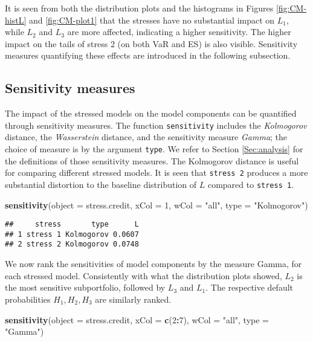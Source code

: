 \documentclass[
]{article}
\newenvironment{Shaded}{\begin{snugshade}}{\end{snugshade}}
\newcommand{\DataTypeTok}[1]{\textcolor[rgb]{0.13,0.29,0.53}{#1}}
\newcommand{\DecValTok}[1]{\textcolor[rgb]{0.00,0.00,0.81}{#1}}
\newcommand{\KeywordTok}[1]{\textcolor[rgb]{0.13,0.29,0.53}{\textbf{#1}}}
\newcommand{\NormalTok}[1]{#1}
\newcommand{\OperatorTok}[1]{\textcolor[rgb]{0.81,0.36,0.00}{\textbf{#1}}}
\newcommand{\StringTok}[1]{\textcolor[rgb]{0.31,0.60,0.02}{#1}}
\begin{document}
It is seen from both the distribution plots and the histograms in Figures \ref{fig:CM-histL} and \ref{fig:CM-plot1} that the stresses have no substantial impact on \(L_1\), while \(L_2\) and \(L_3\) are more affected, indicating a higher sensitivity. The higher impact on the tails of stress 2 (on both VaR and ES) is also visible. Sensitivity measures quantifying these effects are introduced in the following subsection.

\hypertarget{sensitivity-measures-1}{%
\subsection{Sensitivity measures}\label{sensitivity-measures-1}}

The impact of the stressed models on the model components can be quantified through sensitivity measures. The function \texttt{sensitivity} includes the \emph{Kolmogorov} distance, the \emph{Wasserstein} distance, and the sensitivity measure \emph{Gamma}; the choice of measure is by the argument \texttt{type}. We refer to Section \ref{Sec:analysis} for the definitions of those sensitivity measures. The Kolmogorov distance is useful for comparing different stressed models. It is seen that \texttt{stress\ 2} produces a more substantial distortion to the baseline distribution of \(L\) compared to \texttt{stress\ 1}.

\begin{Shaded}
\begin{Highlighting}[]
\KeywordTok{sensitivity}\NormalTok{(}\DataTypeTok{object =}\NormalTok{ stress.credit, }\DataTypeTok{xCol =} \DecValTok{1}\NormalTok{, }\DataTypeTok{wCol =} \StringTok{"all"}\NormalTok{, }\DataTypeTok{type =} \StringTok{"Kolmogorov"}\NormalTok{)}
\end{Highlighting}
\end{Shaded}

\begin{verbatim}
##     stress       type      L
## 1 stress 1 Kolmogorov 0.0607
## 2 stress 2 Kolmogorov 0.0748
\end{verbatim}

We now rank the sensitivities of model components by the measure Gamma, for each stressed model. Consistently with what the distribution plots showed, \(L_2\) is the most sensitive subportfolio, followed by \(L_3\) and \(L_1\). The respective default probabilities \(H_1,H_2,H_3\) are similarly ranked.

\begin{Shaded}
\begin{Highlighting}[]
\KeywordTok{sensitivity}\NormalTok{(}\DataTypeTok{object =}\NormalTok{ stress.credit, }\DataTypeTok{xCol =} \KeywordTok{c}\NormalTok{(}\DecValTok{2}\OperatorTok{:}\DecValTok{7}\NormalTok{), }\DataTypeTok{wCol =} \StringTok{"all"}\NormalTok{, }\DataTypeTok{type =} \StringTok{"Gamma"}\NormalTok{)}
\end{Highlighting}
\end{Shaded}
\end{document}
